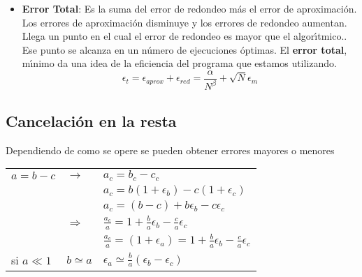 \documentclass[spanish,titlepage,11pt]{article}
\begin{document}
\begin{itemize}
\item \textbf{Error Total}: Es la suma del error de redondeo m\'{a}s el error
de aproximaci\'{o}n. Los errores de aproximaci\'{o}n disminuye y los errores
de redondeo aumentan. Llega un punto en el cual el error de redondeo es mayor
que el algor\'{\i}tmico.. Ese punto se alcanza en un n\'{u}mero de ejecuciones
\'{o}ptimas. El \textbf{error total}, m\'{\i}nimo da una idea de la eficiencia
del programa que estamos utilizando.
\begin{equation}
\epsilon_{t}=\epsilon_{aprox}+\epsilon_{red}=\frac{\alpha}{N^{\beta}}+\sqrt
{N}\epsilon_{m}%
\end{equation}
\end{itemize}

\subsection{Cancelaci\'{o}n en la resta}

Dependiendo de como se opere se pueden obtener errores mayores o menores

\begin{center}%
\begin{tabular}
[c]{lll}%
$a=b-c$ & $\longrightarrow$ & $a_{c}=b_{c}-c_{c}$\\
&  & $a_{c}=b\left(  1+\epsilon_{b}\right)  -c\left(  1+\epsilon_{c}\right)
$\\
&  & $a_{c}=\left(  b-c\right)  +b\epsilon_{b}-c\epsilon_{c}$\\
& $\Longrightarrow$ & $\frac{a_{c}}{a}=1+\frac{b}{a}\epsilon_{b}-\frac{c}%
{a}\epsilon_{c}$\\
&  & $\frac{a_{c}}{a}=\left(  1+\epsilon_{a}\right)  =1+\frac{b}{a}%
\epsilon_{b}-\frac{c}{a}\epsilon_{c}$\\
si $a\ll1$ & $b\simeq a$ & $\epsilon_{a}\simeq\frac{b}{a}\left(  \epsilon
_{b}-\epsilon_{c}\right)  $%
\end{tabular}
\end{center}
\end{document}
